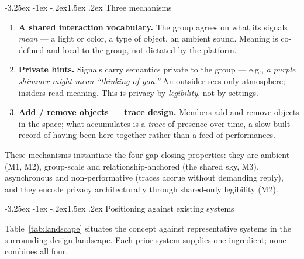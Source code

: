 \documentclass[11pt]{article}
\makeatletter
\renewcommand\subsection{\@startsection{subsection}{2}{\z@}%
  {-3.25ex \@plus -1ex \@minus -.2ex}{1.5ex \@plus .2ex}%
  {\normalfont\large\bfseries\color{accent}}}
\makeatother
\begin{document}
\subsection{Three mechanisms}

\begin{enumerate}[label=\textbf{M\arabic*.}, leftmargin=2.4em]
\item \textbf{A shared interaction vocabulary.} The group agrees on what its
signals \emph{mean} --- a light or color, a type of object, an ambient sound.
Meaning is co-defined and local to the group, not dictated by the platform.
\item \textbf{Private hints.} Signals carry semantics private to the group ---
e.g., \emph{a purple shimmer might mean ``thinking of you.''} An outsider sees
only atmosphere; insiders read meaning. This is privacy by \emph{legibility}, not
by settings.
\item \textbf{Add / remove objects --- trace design.} Members add and remove
objects in the space; what accumulates is a \emph{trace} of presence over time,
a slow-built record of having-been-here-together rather than a feed of
performances.
\end{enumerate}

These mechanisms instantiate the four gap-closing properties: they are ambient
(M1, M2), group-scale and relationship-anchored (the shared sky, M3),
asynchronous and non-performative (traces accrue without demanding reply), and
they encode privacy architecturally through shared-only legibility (M2).

\subsection{Positioning against existing systems}

Table~\ref{tab:landscape} situates the concept against representative systems in
the surrounding design landscape. Each prior system supplies one ingredient;
none combines all four.
\end{document}
